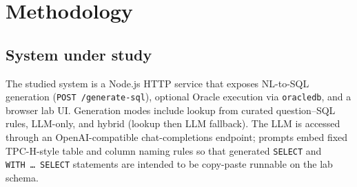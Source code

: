 %

\begin{abstract}
Natural-language interfaces to relational databases remain vulnerable to \emph{speculative} SQL: statements that appear plausible yet reference non-existent relations or columns, or that execute but answer the wrong question.
We describe an \emph{execution-grounded} pipeline for Oracle NL-to-SQL in which trust is anchored to observable database behavior rather than model prose alone.
A schema-aware prompt builder constrains generation to a documented table set; retrieval-augmented generation (RAG) supplies book excerpts and, when available, validated question--SQL pairs from an append-only query log.
Before presentation to the user, generated read-only SQL undergoes static checks against a machine-readable schema reference and optional on-server execution; the interface surfaces a structured verification verdict (static issues, parse/execute outcome, row counts, timing) and records explicit user feedback.
For offline benchmarking, an evaluation harness executes human-authored baseline SQL and model-generated SQL on the same Oracle instance, compares result sets under multiple equivalence notions, and records \texttt{EXPLAIN~PLAN} cost and latency deltas.
This design separates \emph{generation} from \emph{grounding}: hallucinations are detected when they contradict the schema, the executor, or (in batch evaluation) gold-intent result semantics---not when a language model merely sounds confident.
\end{abstract}

\section{Methodology}
\label{sec:methodology}

\subsection{System under study}
The studied system is a Node.js HTTP service that exposes NL-to-SQL generation (\texttt{POST /generate-sql}), optional Oracle execution via \texttt{oracledb}, and a browser lab UI.
Generation modes include lookup from curated question--SQL rules, LLM-only, and hybrid (lookup then LLM fallback).
The LLM is accessed through an OpenAI-compatible chat-completions endpoint; prompts embed fixed TPC-H-style table and column naming rules so that generated \texttt{SELECT} and \texttt{WITH\,\ldots\,SELECT} statements are intended to be copy-paste runnable on the lab schema.

